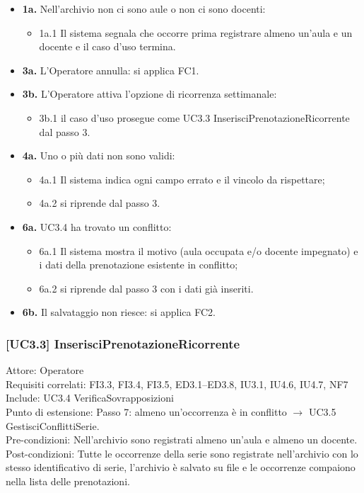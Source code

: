 \begin{itemize}
\item \textbf{1a.} Nell'archivio non ci sono aule o non ci sono docenti:
\begin{itemize}
\item 1a.1 Il sistema segnala che occorre prima registrare almeno un'aula e un docente e il caso d'uso termina.
\end{itemize}
\item \textbf{3a.} L'Operatore annulla: si applica FC1.
\item \textbf{3b.} L'Operatore attiva l'opzione di ricorrenza settimanale:
\begin{itemize}
\item 3b.1 il caso d'uso prosegue come UC3.3 InserisciPrenotazioneRicorrente dal passo 3.
\end{itemize}
\item \textbf{4a.} Uno o più dati non sono validi:
\begin{itemize}
\item 4a.1 Il sistema indica ogni campo errato e il vincolo da rispettare;
\item 4a.2 si riprende dal passo 3.
\end{itemize}
\item \textbf{6a.} UC3.4 ha trovato un conflitto:
\begin{itemize}
\item 6a.1 Il sistema mostra il motivo (aula occupata e/o docente impegnato) e i dati della prenotazione esistente in conflitto;
\item 6a.2 si riprende dal passo 3 con i dati già inseriti.
\end{itemize}
\item \textbf{6b.} Il salvataggio non riesce: si applica FC2.
\end{itemize}

\subsubsection{[UC3.3] InserisciPrenotazioneRicorrente}
\noindent Attore: Operatore\\
Requisiti correlati: FI3.3, FI3.4, FI3.5, ED3.1–ED3.8, IU3.1, IU4.6, IU4.7, NF7\\
Include: UC3.4 VerificaSovrapposizioni\\
Punto di estensione: Passo 7: almeno un'occorrenza è in conflitto $\rightarrow$ UC3.5 GestisciConflittiSerie.\\
Pre-condizioni: Nell'archivio sono registrati almeno un'aula e almeno un docente.\\
Post-condizioni: Tutte le occorrenze della serie sono registrate nell'archivio con lo stesso identificativo di serie, l'archivio è salvato su file e le occorrenze compaiono nella lista delle prenotazioni.\\

